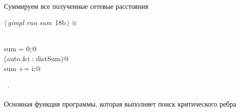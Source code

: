 \documentclass[12pt]{article}
\begin{document}
\paragraph{}
Суммируем все полученные сетевые расстояния
\begin{flushleft} \small
\begin{minipage}{\linewidth}\label{scrap31}\raggedright\small
{} $\langle\,${\itshape gimpl run sum}\nobreak\ {\footnotesize {18b}}$\,\rangle\equiv$
\vspace{-1ex}
\begin{list}{}{} \item
\mbox{}\verb@@\\
\mbox{}\verb@double sum = 0;@\\
\mbox{}\verb@for (auto &i : distSum)@\\
\mbox{}\verb@    sum += i;@\\
\mbox{}\verb@@{\NWsep}
\end{list}
\vspace{-1.5ex}
\footnotesize
\begin{list}{}{\setlength{\itemsep}{-\parsep}\setlength{\itemindent}{-\leftmargin}}
\item \NWtxtMacroRefIn\ .

\item{}
\end{list}
\end{minipage}\vspace{4ex}
\end{flushleft}
\paragraph{}
Основная функция программы, которая выполняет поиск критического ребра
\end{document}
